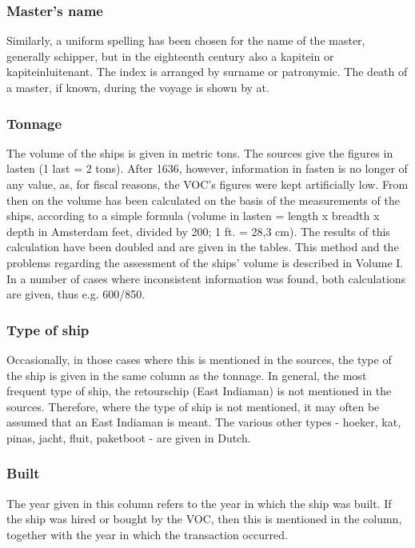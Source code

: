 \documentclass[10pt,twocolumn,fleqn]{article}
\begin{document}
\subsubsection*{Master's name}
Similarly, a uniform spelling has been chosen for the name of the master, 
generally schipper, but in the eighteenth century also a kapitein or 
kapiteinluitenant. The index is arranged by surname or patronymic. 
The death of a master, if known, during the voyage is shown by at.

\subsubsection*{Tonnage}
The volume of the ships is given in metric tons. The sources give the 
figures in lasten (1 last = 2 tons). After 1636, however, information 
in fasten is no longer of any value, as, for fiscal reasons, the VOC's 
figures were kept artificially low. From then on the volume has been 
calculated on the basis of the measurements of the ships, according to a 
simple formula (volume in lasten = length x breadth x depth in Amsterdam 
feet, divided by 200; 1 ft. = 28,3 cm). The results of this calculation 
have been doubled and are given in the tables. This method and the 
problems regarding the assessment of the ships' volume is described in 
Volume I. In a number of cases where inconsistent information was found, 
both calculations are given, thus e.g. 600/850. 

\subsubsection*{Type of ship}
Occasionally, in those cases where this is mentioned in the sources, the 
type of the ship is given in the same column as the tonnage. In general, 
the most frequent type of ship, the retourschip (East Indiaman) is 
not mentioned in the sources. Therefore, where the type of ship is 
not mentioned, it may often be assumed that an East Indiaman is meant.
The various other types - hoeker, kat, pinas, jacht, fluit, paketboot - 
are given in Dutch.

\subsubsection*{Built}
The year given in this column refers to the year in which the ship was built.
If the ship was hired or bought by the VOC, then this is mentioned in the
column, together with the year in which the transaction occurred.
\end{document}
